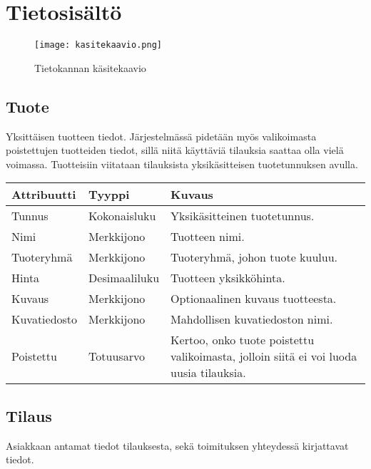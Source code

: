 \documentclass[a4paper, 12pt, finnish]{article}
\begin{document}
\section{Tietosisältö}

\begin{figure}[H]
	\begin{center}
	\caption{Tietokannan käsitekaavio}
	\texttt{[image: kasitekaavio.png]}
	\end{center}
\end{figure}

\subsection*{Tuote}
Yksittäisen tuotteen tiedot. Järjestelmässä pidetään myös valikoimasta poistettujen tuotteiden tiedot, sillä niitä käyttäviä tilauksia saattaa olla vielä voimassa. Tuotteisiin viitataan tilauksista yksikäsitteisen tuotetunnuksen avulla.

\vspace{0.5cm}\hspace{-1cm}
\begin{tabular}{l l p{7cm}}
\textbf{Attribuutti} & \textbf{Tyyppi} & \textbf{Kuvaus} \\
\hline
Tunnus & Kokonaisluku & Yksikäsitteinen tuotetunnus. \\
Nimi & Merkkijono & Tuotteen nimi. \\
Tuoteryhmä & Merkkijono & Tuoteryhmä, johon tuote kuuluu. \\
Hinta & Desimaaliluku & Tuotteen yksikköhinta. \\
Kuvaus & Merkkijono & Optionaalinen kuvaus tuotteesta. \\
Kuvatiedosto & Merkkijono & Mahdollisen kuvatiedoston nimi. \\
Poistettu & Totuusarvo & Kertoo, onko tuote poistettu valikoimasta, jolloin siitä ei voi luoda uusia tilauksia. \\
\end{tabular}

\subsection*{Tilaus}
Asiakkaan antamat tiedot tilauksesta, sekä toimituksen yhteydessä kirjattavat tiedot.
\end{document}
